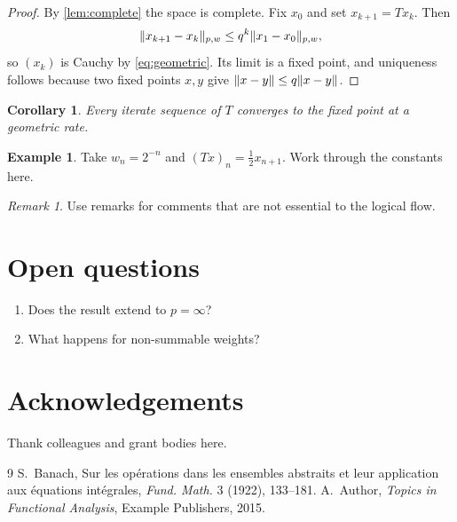 \documentclass[11pt]{article}
\theoremstyle{plain}
\newtheorem{corollary}[theorem]{Corollary}
\theoremstyle{definition}
\newtheorem{example}[theorem]{Example}
\theoremstyle{remark}
\newtheorem{remark}[theorem]{Remark}
\DeclarePairedDelimiter\norm{\lVert}{\rVert}
\begin{document}
\begin{proof}
By \cref{lem:complete} the space is complete. Fix $x_0$ and set $x_{k+1} = T x_k$. Then
\begin{equation}\label{eq:geometric}
  \norm{x_{k+1} - x_k}_{p,w} \le q^k \norm{x_1 - x_0}_{p,w},
\end{equation}
so $(x_k)$ is Cauchy by \eqref{eq:geometric}. Its limit is a fixed point, and uniqueness follows because two fixed points $x,y$ give $\norm{x-y} \le q\norm{x-y}$.
\end{proof}

\begin{corollary}
Every iterate sequence of $T$ converges to the fixed point at a geometric rate.
\end{corollary}

\begin{example}
Take $w_n = 2^{-n}$ and $(Tx)_n = \tfrac{1}{2} x_{n+1}$. Work through the constants here.
\end{example}

\begin{remark}
Use remarks for comments that are not essential to the logical flow.
\end{remark}

\section{Open questions}
\begin{enumerate}[label=(Q\arabic*)]
  \item Does the result extend to $p = \infty$?
  \item What happens for non-summable weights?
\end{enumerate}

\section*{Acknowledgements}
Thank colleagues and grant bodies here.

\begin{thebibliography}{9}
 S.~Banach, Sur les op\'erations dans les ensembles abstraits et leur application aux \'equations int\'egrales, \emph{Fund. Math.} 3 (1922), 133--181.
 A.~Author, \emph{Topics in Functional Analysis}, Example Publishers, 2015.
\end{thebibliography}
\end{document}

